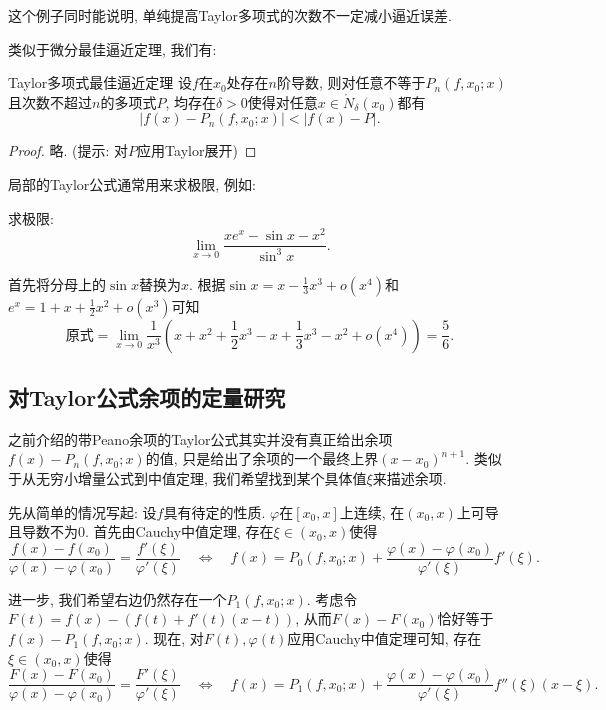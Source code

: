 这个例子同时能说明, 单纯提高Taylor多项式的次数不一定减小逼近误差. 

类似于微分最佳逼近定理, 我们有: 

\begin{theorem}{Taylor多项式最佳逼近定理}
	设$f$在$x_0$处存在$n$阶导数, 则对任意不等于$P_n(f,x_0;x)$且次数不超过$n$的多项式$P$, 均存在$\delta >0$使得对任意$x \in \mathring{N}_{\delta}(x_0)$都有$$|f(x)-P_n(f,x_0;x)| < |f(x)-P|.$$
\end{theorem}
\begin{proof}
	略. (提示: 对$P$应用Taylor展开)
\end{proof}

局部的Taylor公式通常用来求极限, 例如: 

\begin{example}
	求极限: $$\lim_{x\to 0} \frac{xe^x - \sin x -x^2}{\sin ^3 x}. $$
\end{example}
\begin{solution}
	首先将分母上的$\sin x$替换为$x$. 根据$\sin x = x - \frac{1}{3} x^3 + o(x^4)$和$e^x = 1+x+\frac{1}{2}x^2+o(x^3)$可知$$\textit{原式} = \lim_{x\to 0} \frac{1}{x^3}\left( x+x^2+\frac{1}{2}x^3 - x + \frac{1}{3}x^3 - x^2 +o(x^4) \right) = \frac{5}{6}. $$
\end{solution}


\subsection{对Taylor公式余项的定量研究}

之前介绍的带Peano余项的Taylor公式其实并没有真正给出余项$f(x)-P_n(f,x_0;x)$的值, 只是给出了余项的一个最终上界$(x-x_0)^{n+1}$. 类似于从无穷小增量公式到中值定理, 我们希望找到某个具体值$\xi$来描述余项. 

先从简单的情况写起: 设$f$具有待定的性质. $\varphi$在$[x_0,x]$上连续, 在$(x_0,x)$上可导且导数不为$0$. 首先由Cauchy中值定理, 存在$\xi \in (x_0,x)$使得
\begin{equation}
	\frac{f(x)-f(x_0)}{\varphi (x)-\varphi (x_0)} = \frac{f'(\xi)}{\varphi '(\xi)} \quad \Leftrightarrow \quad f(x) = P_0(f,x_0;x) + \frac{\varphi (x)-\varphi (x_0)}{\varphi '(\xi)} f'(\xi). \label{eq:taylor0}
\end{equation}

进一步, 我们希望右边仍然存在一个$P_1(f,x_0;x)$. 考虑令$F(t)=f(x)-(f(t)+f'(t)(x-t))$, 从而$F(x)-F(x_0)$恰好等于$f(x)-P_1(f,x_0;x)$. 现在, 对$F(t),\varphi (t)$应用Cauchy中值定理可知, 存在$\xi \in (x_0,x)$使得
\begin{equation}
	\frac{F(x)-F(x_0)}{\varphi (x)-\varphi (x_0)} = \frac{F'(\xi)}{\varphi '(\xi)} \quad \Leftrightarrow \quad f(x) = P_1(f,x_0;x) + \frac{\varphi (x) - \varphi (x_0)}{\varphi '(\xi)} f''(\xi)(x-\xi). \label{eq:taylor1}
\end{equation}

